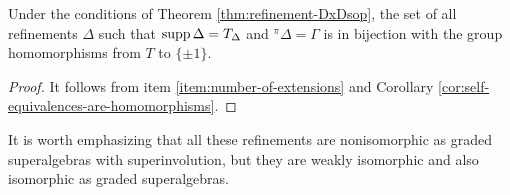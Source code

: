     
    

\begin{cor}\label{cor:old-item-iv}
    Under the conditions of Theorem \ref{thm:refinement-DxDsop}, the set of all refinements $\Delta$ such that $\operatorname{supp} \Delta = T_\Delta$ and ${}^\pi \Delta = \Gamma$ is in bijection with the group homomorphisms from $T$ to $\{ \pm 1 \}$.
\end{cor}

\begin{proof}
    It follows from item \eqref{item:number-of-extensions} and Corollary \ref{cor:self-equivalences-are-homomorphisms}.
\end{proof}

It is worth emphasizing that all these refinements are nonisomorphic as graded superalgebras with superinvolution, but they are weakly isomorphic and also isomorphic as graded superalgebras. 





